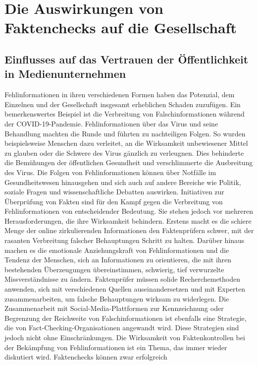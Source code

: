 \documentclass[a4paper,listof=totoc,bibliography=totoc]{scrartcl}
\begin{document}
\section{Die Auswirkungen von Faktenchecks auf die Gesellschaft}

\subsection{Einflusses auf das Vertrauen der Öffentlichkeit in Medienunternehmen}

Fehlinformationen in ihren verschiedenen Formen haben das Potenzial, dem Einzelnen und der Gesellschaft insgesamt erheblichen Schaden zuzufügen. 
Ein bemerkenswertes Beispiel ist die Verbreitung von Falschinformationen während der COVID-19-Pandemie. Fehlinformationen über das Virus und seine 
Behandlung machten die Runde und führten zu nachteiligen Folgen. So wurden beispielsweise Menschen dazu verleitet, an die Wirksamkeit unbewiesener 
Mittel zu glauben oder die Schwere des Virus gänzlich zu verleugnen. Dies behinderte die Bemühungen der öffentlichen Gesundheit und verschlimmerte 
die Ausbreitung des Virus. Die Folgen von Fehlinformationen können über Notfälle im Gesundheitswesen hinausgehen und sich auch auf andere Bereiche 
wie Politik, soziale Fragen und wissenschaftliche Debatten auswirken.
Initiativen zur Überprüfung von Fakten sind für den Kampf gegen die Verbreitung von Fehlinformationen von entscheidender Bedeutung. Sie stehen jedoch 
vor mehreren Herausforderungen, die ihre Wirksamkeit behindern. 
\newline
\newline
Erstens macht es die schiere Menge der online zirkulierenden Informationen den Faktenprüfern 
schwer, mit der rasanten Verbreitung falscher Behauptungen Schritt zu halten. Darüber hinaus machen es die emotionale Anziehungskraft von Fehlinformationen und 
die Tendenz der Menschen, sich an Informationen zu orientieren, die mit ihren bestehenden Überzeugungen übereinstimmen, schwierig, tief verwurzelte Missverständnisse 
zu ändern. Faktenprüfer müssen solide Recherchemethoden anwenden, sich mit verschiedenen Quellen auseinandersetzen und mit Experten zusammenarbeiten, um falsche 
Behauptungen wirksam zu widerlegen. Die Zusammenarbeit mit Social-Media-Plattformen zur Kennzeichnung oder Begrenzung der Reichweite von Falschinformationen ist 
ebenfalls eine Strategie, die von Fact-Checking-Organisationen angewandt wird. Diese Strategien sind jedoch nicht ohne Einschränkungen.
Die Wirksamkeit von Faktenkontrollen bei der Bekämpfung von Fehlinformationen ist ein Thema, das immer wieder diskutiert wird. Faktenchecks können zwar erfolgreich 
\end{document}
